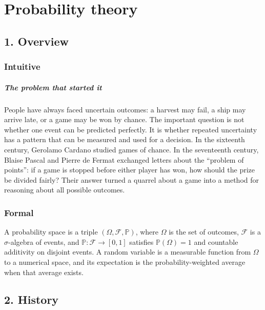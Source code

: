 \clearpage\chapter{Probability theory}
\section*{1. Overview}
\subsection*{Intuitive}
\paragraph{The problem that started it}
People have always faced uncertain outcomes: a harvest may fail, a ship may arrive late, or a game may be won by chance. The important question is not whether one event can be predicted perfectly. It is whether repeated uncertainty has a pattern that can be measured and used for a decision.
In the sixteenth century, Gerolamo Cardano studied games of chance. In the seventeenth century, Blaise Pascal and Pierre de Fermat exchanged letters about the ``problem of points'': if a game is stopped before either player has won, how should the prize be divided fairly? Their answer turned a quarrel about a game into a method for reasoning about all possible outcomes.


\subsection*{Formal}
A probability space is a triple $(\Omega,\mathcal F,\mathbb P)$, where $\Omega$ is the set of outcomes, $\mathcal F$ is a $\sigma$-algebra of events, and $\mathbb P:\mathcal F\to[0,1]$ satisfies $\mathbb P(\Omega)=1$ and countable additivity on disjoint events. A random variable is a measurable function from $\Omega$ to a numerical space, and its expectation is the probability-weighted average when that average exists.
\section*{2. History}
